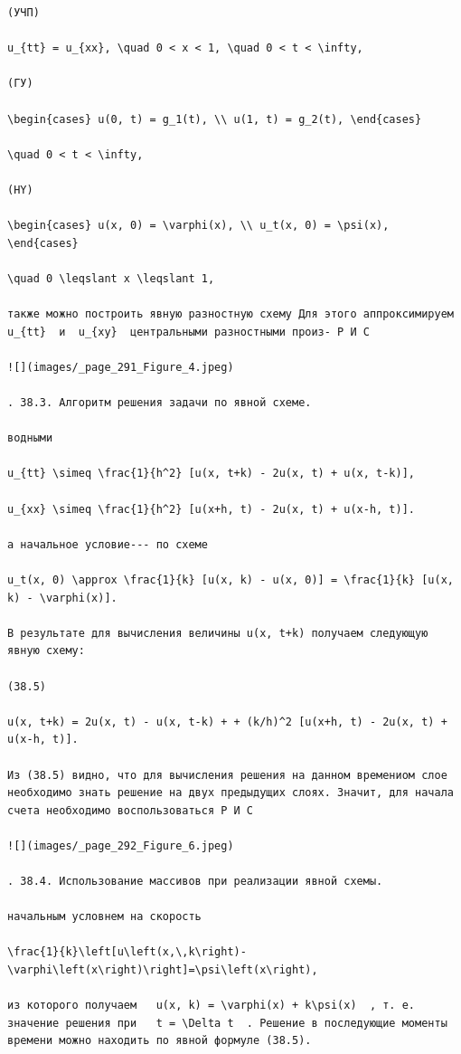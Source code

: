 \documentclass[
  ukrainian,
]{article}
\begin{document}
\begin{verbatim}
(УЧП) 

u_{tt} = u_{xx}, \quad 0 < x < 1, \quad 0 < t < \infty,

(ГУ) 

\begin{cases} u(0, t) = g_1(t), \\ u(1, t) = g_2(t), \end{cases}

\quad 0 < t < \infty,

(HY)

\begin{cases} u(x, 0) = \varphi(x), \\ u_t(x, 0) = \psi(x), \end{cases}

\quad 0 \leqslant x \leqslant 1,

также можно построить явную разностную схему Для этого аппроксимируем  u_{tt}  и  u_{xy}  центральными разностными произ- Р И С

![](images/_page_291_Figure_4.jpeg)

. 38.3. Алгоритм решения задачи по явной схеме.

водными

u_{tt} \simeq \frac{1}{h^2} [u(x, t+k) - 2u(x, t) + u(x, t-k)],

u_{xx} \simeq \frac{1}{h^2} [u(x+h, t) - 2u(x, t) + u(x-h, t)].

а начальное условие--- по схеме

u_t(x, 0) \approx \frac{1}{k} [u(x, k) - u(x, 0)] = \frac{1}{k} [u(x, k) - \varphi(x)].

В результате для вычисления величины u(x, t+k) получаем следующую явную схему:

(38.5)

u(x, t+k) = 2u(x, t) - u(x, t-k) + + (k/h)^2 [u(x+h, t) - 2u(x, t) + u(x-h, t)].

Из (38.5) видно, что для вычисления решения на данном времениом слое необходимо знать решение на двух предыдущих слоях. Значит, для начала счета необходимо воспользоваться Р И С

![](images/_page_292_Figure_6.jpeg)

. 38.4. Использование массивов при реализации явной схемы.

начальным условнем на скорость

\frac{1}{k}\left[u\left(x,\,k\right)-\varphi\left(x\right)\right]=\psi\left(x\right),

из которого получаем   u(x, k) = \varphi(x) + k\psi(x)  , т. е. значение решения при   t = \Delta t  . Решение в последующие моменты времени можно находить по явной формуле (38.5).


\end{verbatim}
\end{document}
